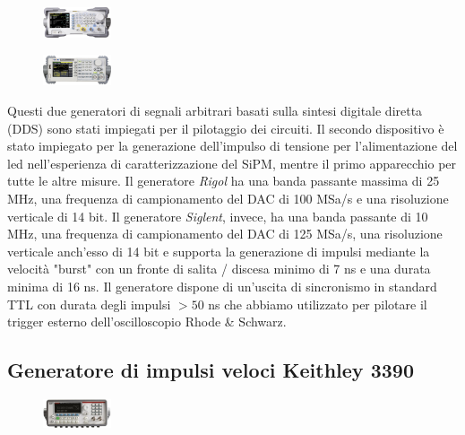 \documentclass[journal]{IEEEtran}
\begin{document}
\begin{figure}[h!]
  \centering
  \includegraphics[width=0.18\textwidth]{lab-reports/Schematics-and-graphics/RIGOL Gen.png}
\end{figure}

\begin{figure}[h!]
  \centering
  \includegraphics[width=0.18\textwidth]{lab-reports/Schematics-and-graphics/SIGLENT Gen.png}
\end{figure}

Questi due generatori di segnali arbitrari basati sulla sintesi digitale diretta (DDS) sono stati impiegati per il pilotaggio dei circuiti. Il secondo dispositivo è stato impiegato per la generazione dell'impulso di tensione per l'alimentazione del led nell'esperienza di caratterizzazione del SiPM, mentre il primo apparecchio per tutte le altre misure. Il generatore \textit{Rigol} ha una banda passante massima di 25 MHz, una frequenza di campionamento del DAC di 100 MSa/s e una risoluzione verticale di 14 bit. Il generatore \textit{Siglent}, invece, ha una banda passante di 10 MHz, una frequenza di campionamento del DAC di 125 MSa/s, una risoluzione verticale anch'esso di 14 bit e supporta la generazione di impulsi mediante la velocità "burst" con un fronte di salita / discesa minimo di 7 ns e una durata minima di 16 ns. Il generatore dispone di un'uscita di sincronismo in standard TTL con durata degli impulsi $> 50$ ns che abbiamo utilizzato per pilotare il trigger esterno dell'oscilloscopio Rhode & Schwarz. \cite{E} \cite{G}

\subsection{\textbf{Generatore di impulsi veloci Keithley 3390}}

\begin{figure}[h!]
  \centering
  \includegraphics[width=0.18\textwidth]{lab-reports/Schematics-and-graphics/KEIT Gen.png}
\end{figure}
\end{document}
